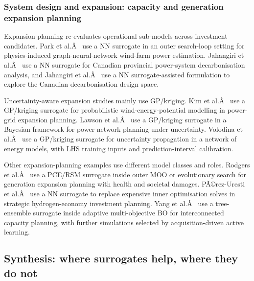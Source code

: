 \documentclass[final,5p,times,twocolumn]{elsarticle}
\begin{document}
\subsubsection{System design and expansion: capacity and generation expansion planning}
\label{sec:apps:expansion}

Expansion planning re-evaluates operational sub-models across investment
candidates. Park et al.Â~\cite{Park2019} use a NN surrogate in an outer
search-loop setting for physics-induced graph-neural-network wind-farm
power estimation. Jahangiri et al.Â~\cite{Jahangiri20244849} use a NN
surrogate for Canadian provincial power-system decarbonisation analysis,
and Jahangiri et al.Â~\cite{Jahangiri2023} use a NN surrogate-assisted
formulation to explore the Canadian decarbonisation design space.

Uncertainty-aware expansion studies mainly use GP/kriging. Kim et
al.Â~\cite{Kim2021} use a GP/kriging surrogate for probabilistic
wind-energy-potential modelling in power-grid expansion planning. Lawson
et al.Â~\cite{Lawson201647} use a GP/kriging surrogate in a Bayesian
framework for power-network planning under uncertainty. Volodina et
al.Â~\cite{Volodina2022} use a GP/kriging surrogate for uncertainty
propagation in a network of energy models, with LHS training inputs and
prediction-interval calibration.

Other expansion-planning examples use different model classes and roles.
Rodgers et al.Â~\cite{Rodgers2018951} use a PCE/RSM surrogate inside outer
MOO or evolutionary search for generation expansion planning with health
and societal damages. PÃ©rez-Uresti et al.Â~\cite{Pérez-Uresti2023} use a NN
surrogate to replace expensive inner optimisation solves in strategic
hydrogen-economy investment planning. Yang et al.Â~\cite{Yang2025} use a
tree-ensemble surrogate inside adaptive multi-objective BO for
interconnected capacity planning, with further simulations selected by
acquisition-driven active learning.

\subsection{Synthesis: where surrogates help, where they do not}
\label{sec:apps:synthesis}
\end{document}
